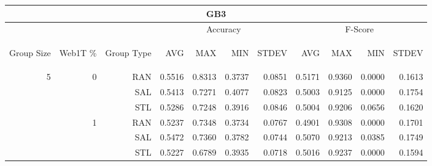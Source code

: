 \begin{center}
\begin{table}[htbp]
\begin{tabular}{ | r | r | r | r | r | r | r | r | r | r | r |}
\hline
\multicolumn{11}{|c|}{GB3}\\
\hline
 & & & \multicolumn{4}{|c|}{Accuracy} & \multicolumn{4}{|c|}{F-Score}\\ \cline{4-11}
\begin{sideways}Group Size\end{sideways} & \begin{sideways}Web1T \%\end{sideways} & \begin{sideways}Group Type\end{sideways} & \begin{sideways}AVG\end{sideways} & \begin{sideways}MAX\end{sideways} & \begin{sideways}MIN\end{sideways} & \begin{sideways}STDEV\end{sideways} & \begin{sideways}AVG\end{sideways} & \begin{sideways}MAX\end{sideways} & \begin{sideways}MIN\end{sideways} & \begin{sideways}STDEV\end{sideways}\\
\hline
\multirow{18}{*}{5}
 & \multirow{3}{*}{0} & RAN & 0.5516 & 0.8313 & 0.3737 & 0.0851 & 0.5171 & 0.9360 & 0.0000 & 0.1613\\ \cline{3-11}
 &   & SAL & 0.5413 & 0.7271 & 0.4077 & 0.0823 & 0.5003 & 0.9125 & 0.0000 & 0.1754\\ \cline{3-11}
 &   & STL & 0.5286 & 0.7248 & 0.3916 & 0.0846 & 0.5004 & 0.9206 & 0.0656 & 0.1620\\ \cline{2-11}
 & \multirow{3}{*}{1} & RAN & 0.5237 & 0.7348 & 0.3734 & 0.0767 & 0.4901 & 0.9308 & 0.0000 & 0.1701\\ \cline{3-11}
 &   & SAL & 0.5472 & 0.7360 & 0.3782 & 0.0744 & 0.5070 & 0.9213 & 0.0385 & 0.1749\\ \cline{3-11}
 &   & STL & 0.5227 & 0.6789 & 0.3935 & 0.0718 & 0.5016 & 0.9237 & 0.0000 & 0.1594\\ \cline{2-11}

\end{tabular}
\end{table}
\end{center}
